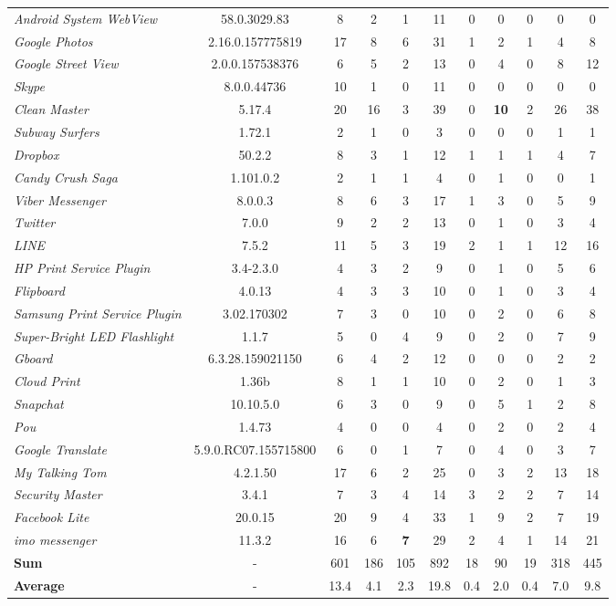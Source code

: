 \documentclass[conference]{IEEEtran}
\begin{document}
\begin{table}
\begin{tabular}{|l|c|cccc|ccccc|}
{\it Android System WebView}&58.0.3029.83&8&2&1&11&0&0&0&0&0\\
{\it Google Photos}&2.16.0.157775819&17&8&6&31&1&2&1&4&8\\
{\it Google Street View}&2.0.0.157538376&6&5&2&13&0&4&0&8&12\\
{\it Skype}&8.0.0.44736&10&1&0&11&0&0&0&0&0\\
{\it Clean Master}&5.17.4&20&16&3&39&0&{\bf 10}&2&26&38\\
{\it Subway Surfers}&1.72.1&2&1&0&3&0&0&0&1&1\\
{\it Dropbox}&50.2.2&8&3&1&12&1&1&1&4&7\\
{\it Candy Crush Saga}&1.101.0.2&2&1&1&4&0&1&0&0&1\\
{\it Viber Messenger}&8.0.0.3&8&6&3&17&1&3&0&5&9\\
{\it Twitter}&7.0.0&9&2&2&13&0&1&0&3&4\\
{\it LINE}&7.5.2&11&5&3&19&2&1&1&12&16\\
{\it HP Print Service Plugin}&3.4-2.3.0&4&3&2&9&0&1&0&5&6\\
{\it Flipboard}&4.0.13&4&3&3&10&0&1&0&3&4\\
{\it Samsung Print Service Plugin}&3.02.170302&7&3&0&10&0&2&0&6&8\\
{\it Super-Bright LED Flashlight}&1.1.7&5&0&4&9&0&2&0&7&9\\
{\it Gboard}&6.3.28.159021150&6&4&2&12&0&0&0&2&2\\
{\it Cloud Print}&1.36b&8&1&1&10&0&2&0&1&3\\
{\it Snapchat}&10.10.5.0&6&3&0&9&0&5&1&2&8\\
{\it Pou}&1.4.73&4&0&0&4&0&2&0&2&4\\
{\it Google Translate}&5.9.0.RC07.155715800&6&0&1&7&0&4&0&3&7\\
{\it My Talking Tom}&4.2.1.50&17&6&2&25&0&3&2&13&18\\
{\it Security Master}&3.4.1&7&3&4&14&3&2&2&7&14\\
{\it Facebook Lite}&20.0.15&20&9&4&33&1&9&2&7&19 \\
{\it imo messenger}&11.3.2&16&6&{\bf 7}&29&2&4&1&14&21\\
\hline
{\bf Sum}&-& 601 &186 & 105 & 892&18&90&19&318&445\\
\hline
{\bf Average}&-&13.4 &  4.1 &  2.3 &  19.8&0.4&2.0&0.4&7.0&9.8\\
\hline
\end{tabular}
\label{tab_resultsum}
\end{table}
\end{document}
